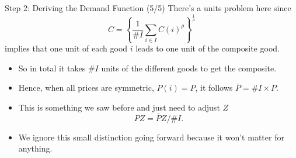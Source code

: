 \documentclass[10pt,c,aspectratio=1610,handout]{beamer}
\begin{document}
\begin{frame}{Step 2: Deriving the Demand Function (5/5)}%
  There's a units problem here since \[ C = \left\{ \frac{1}{\#I}\sum_{i\in I} C(i)^{\rho} \right\}^{\frac{1}{\rho}} \] implies that one unit of each good $i$ leads to one unit of the composite good.%
  \vspace*{0.15in}%
  \pause%
  \begin{itemize}%
    \item[$\blacktriangleright$] So in total it takes $\#I$ units of the different goods to get the composite.%
    \pause%
    \item[$\blacktriangleright$] Hence, when all prices are symmetric, $P(i) = P$, it follows $\bar P = \#I \times P$.%
    \pause%
    \item[$\blacktriangleright$] This is something we saw before and just need to adjust $Z$ \[ PZ = \bar P Z / \#I. \]%
    \pause%
    \item[$\blacktriangleright$] We ignore this small distinction going forward because it won't matter for anything.%
  \end{itemize}%
\end{frame}%
\end{document}
